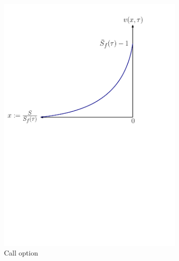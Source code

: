 \begin{figure}[H]
  \centering
  \begin{subfigure}{0.4\textwidth}
    \centering
    \includegraphics[width=\textwidth]{chapters/chapter2/CompanyCallOption.pdf}
    \caption{Call option}
    \label{fig:blackscholes:frontfixingmethod:company_call_value_vs_curve}
  \end{subfigure}
  \begin{subfigure}{0.5\textwidth}
    \centering

\end{subfigure}
\end{figure}
